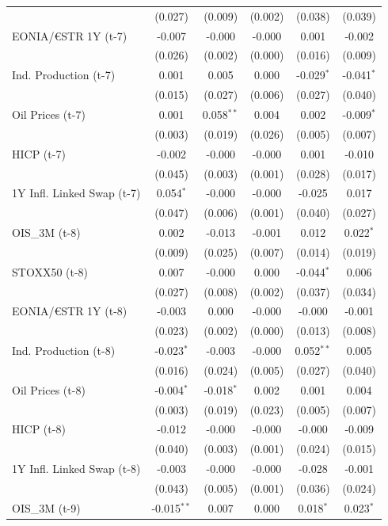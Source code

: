 \begin{longtable}[t]{lccccc}
 & (0.027) & (0.009) & (0.002) & (0.038) & (0.039)\\
EONIA/€STR 1Y (t-7) & -0.007 & -0.000 & -0.000 & 0.001 & -0.002\\
 & (0.026) & (0.002) & (0.000) & (0.016) & (0.009)\\
Ind. Production (t-7) & 0.001 & 0.005 & 0.000 & -0.029$^{*}$ & -0.041$^{*}$\\
 & (0.015) & (0.027) & (0.006) & (0.027) & (0.040)\\
Oil Prices (t-7) & 0.001 & 0.058$^{**}$ & 0.004 & 0.002 & -0.009$^{*}$\\
 & (0.003) & (0.019) & (0.026) & (0.005) & (0.007)\\
HICP (t-7) & -0.002 & -0.000 & -0.000 & 0.001 & -0.010\\
 & (0.045) & (0.003) & (0.001) & (0.028) & (0.017)\\
1Y Infl. Linked Swap (t-7) & 0.054$^{*}$ & -0.000 & -0.000 & -0.025 & 0.017\\
 & (0.047) & (0.006) & (0.001) & (0.040) & (0.027)\\
OIS\_3M (t-8) & 0.002 & -0.013 & -0.001 & 0.012 & 0.022$^{*}$\\
 & (0.009) & (0.025) & (0.007) & (0.014) & (0.019)\\
STOXX50 (t-8) & 0.007 & -0.000 & 0.000 & -0.044$^{*}$ & 0.006\\
 & (0.027) & (0.008) & (0.002) & (0.037) & (0.034)\\
EONIA/€STR 1Y (t-8) & -0.003 & 0.000 & -0.000 & -0.000 & -0.001\\
 & (0.023) & (0.002) & (0.000) & (0.013) & (0.008)\\
Ind. Production (t-8) & -0.023$^{*}$ & -0.003 & -0.000 & 0.052$^{**}$ & 0.005\\
 & (0.016) & (0.024) & (0.005) & (0.027) & (0.040)\\
Oil Prices (t-8) & -0.004$^{*}$ & -0.018$^{*}$ & 0.002 & 0.001 & 0.004\\
 & (0.003) & (0.019) & (0.023) & (0.005) & (0.007)\\
HICP (t-8) & -0.012 & -0.000 & -0.000 & -0.000 & -0.009\\
 & (0.040) & (0.003) & (0.001) & (0.024) & (0.015)\\
1Y Infl. Linked Swap (t-8) & -0.003 & -0.000 & -0.000 & -0.028 & -0.001\\
 & (0.043) & (0.005) & (0.001) & (0.036) & (0.024)\\
OIS\_3M (t-9) & -0.015$^{**}$ & 0.007 & 0.000 & 0.018$^{*}$ & 0.023$^{*}$\\

\end{longtable}
